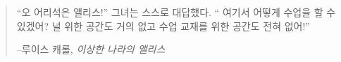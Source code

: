 
\newpage \vspace*{8cm}
\thispagestyle{empty}
\begin{quotation}
\begin{center}
  \large
  \enquote{오 어리석은 앨리스!} 그녀는 스스로 대답했다. \enquote{
  여기서 어떻게 수업을 할 수 있겠어? 널 위한 공간도 거의 없고 수업 교재를 위한 공간도 전혀 없어!}
\end{center}
\begin{flushright} --루이스 캐롤, \textit{이상한 나라의 앨리스}\end{flushright}
\end{quotation}
